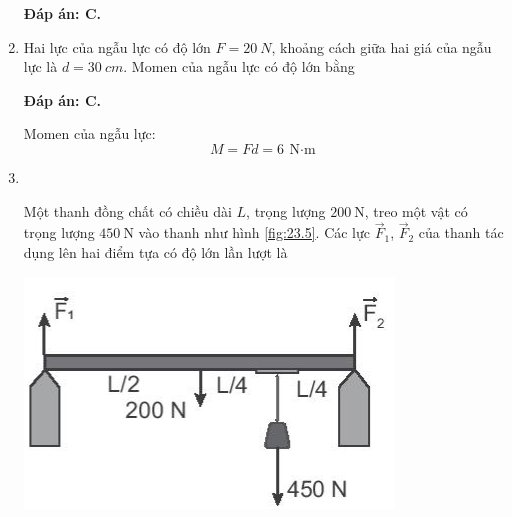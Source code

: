 \begin{enumerate}[label=\bfseries Câu \arabic*:, leftmargin=1.5cm]
	\hideall
	{	\textbf{Đáp án: C.}
		
	}
	\item {}
	
	
	{Hai lực của ngẫu lực có độ lớn $F=\SI{20}{N}$, khoảng cách giữa hai giá của ngẫu lực là $d=\SI{30}{cm}$. Momen của ngẫu lực có độ lớn bằng
	}
	
	\hideall
	{	\textbf{Đáp án: C.}
		
		Momen của ngẫu lực:
		$$M=Fd = \SI{6}{\newton\cdot\meter}$$
	}

\item {}\\
{Một thanh đồng chất có chiều dài $L$, trọng lượng $\SI{200}{\newton}$, treo một vật có trọng lượng $\SI{450}{\newton}$ vào thanh như hình \ref{fig:23.5}. Các lực $\vec F_1$, $\vec F_2$ của thanh tác dụng lên hai điểm tựa có độ lớn lần lượt là
	\begin{center}
		\includegraphics[width=0.4\linewidth]{../figs/VN10-2022-PH-TP023-P-5}
		\label{fig:23.5}
	\end{center}
}


\end{enumerate}
